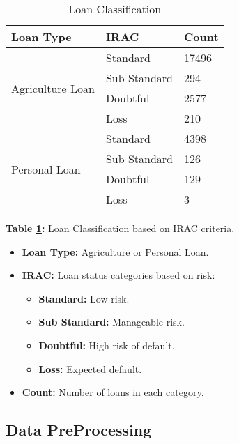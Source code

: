 \documentclass[a4paper]{article}
\begin{document}
\begin{table}[H]
	\centering
	\caption{Loan Classification}
	\label{tab:Loan Classification}
	\begin{tabular}{|l|l|l|}
		\hline
		\textbf{Loan Type} & \textbf{IRAC} & \textbf{Count} \\
		\hline
		\multirow{4}{*}{Agriculture Loan} & Standard & 17496 \\
		\cline{2-3}
		& Sub Standard & 294 \\
		\cline{2-3}
		& Doubtful & 2577 \\
		\cline{2-3}
		& Loss & 210 \\
		\hline
		\multirow{4}{*}{Personal Loan} & Standard & 4398 \\
		\cline{2-3}
		& Sub Standard & 126 \\
		\cline{2-3}
		& Doubtful & 129 \\
		\cline{2-3}
		& Loss & 3 \\
		\hline
	\end{tabular}
	\vspace{1em} %
\begin{flushleft}
	\hspace{8em}
	\textbf{Table \ref{tab:Loan Classification}:} Loan Classification based on IRAC criteria.
	
\begin{itemize}[left=3cm]  %
	\item \textbf{Loan Type:} Agriculture or Personal Loan.
	\item \textbf{IRAC:} Loan status categories based on risk:
	\begin{itemize}[left=1cm]  %
		\item \textbf{Standard:} Low risk.
		\item \textbf{Sub Standard:} Manageable risk.
		\item \textbf{Doubtful:} High risk of default.
		\item \textbf{Loss:} Expected default.
	\end{itemize}
	\item \textbf{Count:} Number of loans in each category.
\end{itemize}

\end{flushleft}

\end{table}

 
 \subsection{Data PreProcessing}
\end{document}

